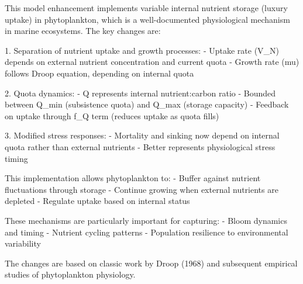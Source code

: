 This model enhancement implements variable internal nutrient storage (luxury uptake) in phytoplankton, which is a well-documented physiological mechanism in marine ecosystems. The key changes are:

1. Separation of nutrient uptake and growth processes:
   - Uptake rate (V_N) depends on external nutrient concentration and current quota
   - Growth rate (mu) follows Droop equation, depending on internal quota
   
2. Quota dynamics:
   - Q represents internal nutrient:carbon ratio
   - Bounded between Q_min (subsistence quota) and Q_max (storage capacity)
   - Feedback on uptake through f_Q term (reduces uptake as quota fills)
   
3. Modified stress responses:
   - Mortality and sinking now depend on internal quota rather than external nutrients
   - Better represents physiological stress timing

This implementation allows phytoplankton to:
- Buffer against nutrient fluctuations through storage
- Continue growing when external nutrients are depleted
- Regulate uptake based on internal status

These mechanisms are particularly important for capturing:
- Bloom dynamics and timing
- Nutrient cycling patterns
- Population resilience to environmental variability

The changes are based on classic work by Droop (1968) and subsequent empirical studies of phytoplankton physiology.
